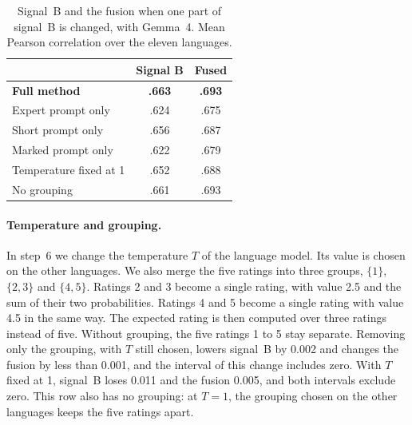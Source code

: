 \documentclass[11pt]{article}
\begin{document}
\begin{table}[t]
\centering
\small
\setlength{\tabcolsep}{3pt}
\begin{tabular}{lcc}
\toprule
 & Signal B & Fused \\
\midrule
\textbf{Full method}          & \textbf{.663} & \textbf{.693} \\ %
\midrule
Expert prompt only            & .624 & .675 \\ %
Short prompt only             & .656 & .687 \\ %
Marked prompt only            & .622 & .679 \\ %
\midrule
Temperature fixed at 1        & .652 & .688 \\ %
No grouping                   & .661 & .693 \\ %
\bottomrule
\end{tabular}
\caption{Signal~B and the fusion when one part of signal~B is changed, with Gemma~4. Mean Pearson
correlation over the eleven languages.}
\label{tab:signal-b}
\end{table}

\paragraph{Temperature and grouping.} In step~6 we change the temperature $T$ of the language %
model. Its value is chosen on the other languages. We also merge the five ratings into three groups, %
$\{1\}$, $\{2, 3\}$ and $\{4, 5\}$. Ratings 2 and 3
become a single rating, with value 2.5 and the sum of their two probabilities. Ratings 4 and 5
become a single rating with value 4.5 in the same way. The expected rating is then computed over
three ratings instead of five. Without grouping, the five ratings 1 to 5 stay separate. Removing %
only the grouping, with $T$ still chosen, lowers signal~B by
0.002 and changes the fusion by less than 0.001, and the interval of this change includes zero.
With $T$ fixed at 1, signal~B loses 0.011 and the fusion 0.005, and both intervals exclude zero. %
This row also has no grouping: at $T = 1$, the grouping chosen on the other languages keeps the %
five ratings apart.
\end{document}
